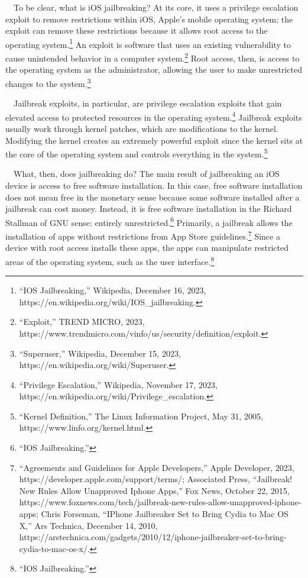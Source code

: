 \documentclass{article}
\begin{document}
\ \ To be clear, what is iOS jailbreaking? At its core, it uses a privilege escalation exploit to remove restrictions
within iOS, Apple's mobile operating system; the exploit can remove these restrictions because it allows root access to
the operating system.\footnote{“IOS Jailbreaking,” Wikipedia, December 16, 2023,
https://en.wikipedia.org/wiki/IOS\_jailbreaking.} An exploit is software that uses an existing vulnerability to cause
unintended behavior in a computer system.\footnote{“Exploit,” TREND MICRO, 2023,
https://www.trendmicro.com/vinfo/us/security/definition/exploit.} Root access, then, is access to the operating system
as the administrator, allowing the user to make unrestricted changes to the system.\footnote{“Superuser,” Wikipedia,
December 15, 2023, https://en.wikipedia.org/wiki/Superuser.}

\ \ Jailbreak exploits, in particular, are privilege escalation exploits that gain elevated access to protected
resources in the operating system.\footnote{“Privilege Escalation,” Wikipedia, November 17, 2023,
https://en.wikipedia.org/wiki/Privilege\_escalation.} Jailbreak exploits usually work through kernel patches, which are
modifications to the kernel. Modifying the kernel creates an extremely powerful exploit since the kernel sits at the
core of the operating system and controls everything in the system.\footnote{“Kernel Definition,” The Linux Information
Project, May 31, 2005, https://www.linfo.org/kernel.html.}

\ \ What, then, does jailbreaking do? The main result of jailbreaking an iOS device is access to free software
installation. In this case, free software installation does not mean free in the monetary sense because some software
installed after a jailbreak can cost money. Instead, it is free software installation in the Richard Stallman of GNU
sense: entirely unrestricted.\footnote{“IOS Jailbreaking.”} Primarily, a jailbreak allows the installation of apps
without restrictions from App Store guidelines.\footnote{“Agreements and Guidelines for Apple Developers,” Apple
Developer, 2023, https://developer.apple.com/support/terms/; Associated Press, “Jailbreak! New Rules Allow Unapproved
Iphone Apps,” Fox News, October 22, 2015,
https://www.foxnews.com/tech/jailbreak-new-rules-allow-unapproved-iphone-apps; Chris Forseman, “IPhone Jailbreaker Set
to Bring Cydia to Mac OS X,” Ars Technica, December 14, 2010,
https://arstechnica.com/gadgets/2010/12/iphone-jailbreaker-set-to-bring-cydia-to-mac-os-x/.} Since a device with root
access installs these apps, the apps can manipulate restricted areas of the operating system, such as the user
interface.\footnote{“IOS Jailbreaking.”}
\end{document}
